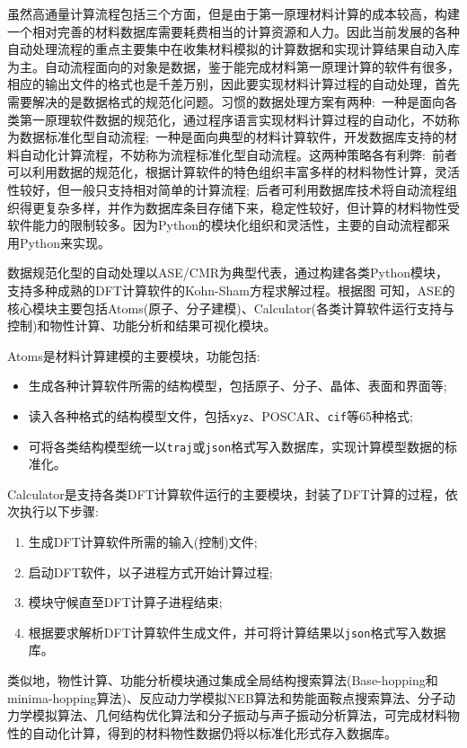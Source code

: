 虽然高通量计算流程包括三个方面，但是由于第一原理材料计算的成本较高，构建一个相对完善的材料数据库需要耗费相当的计算资源和人力。因此当前发展的各种自动处理流程的重点主要集中在收集材料模拟的计算数据和实现计算结果自动入库为主。自动流程面向的对象是数据，鉴于能完成材料第一原理计算的软件有很多，相应的输出文件的格式也是千差万别，因此要实现材料计算过程的自动处理，首先需要解决的是数据格式的规范化问题。习惯的数据处理方案有两种:~一种是面向各类第一原理软件数据的规范化，通过程序语言实现材料计算过程的自动化，不妨称为数据标准化型自动流程;~一种是面向典型的材料计算软件，开发数据库支持的材料自动化计算流程，不妨称为流程标准化型自动流程。这两种策略各有利弊:~前者可以利用数据的规范化，根据计算软件的特色组织丰富多样的材料物性计算，灵活性较好，但一般只支持相对简单的计算流程;~后者可利用数据库技术将自动流程组织得更复杂多样，并作为数据库条目存储下来，稳定性较好，但计算的材料物性受软件能力的限制较多。因为\textrm{Python}\cite{Python_URL}的模块化组织和灵活性，主要的自动流程都采用\textrm{Python}来实现。

数据规范化型的自动处理以\textrm{ASE/CMR}为典型代表，通过构建各类\textrm{Python}模块，支持多种成熟的\textrm{DFT}计算软件的\textrm{Kohn-Sham}方程求解过程。根据图%
可知，\textrm{ASE}的核心模块主要包括\textrm{Atoms}(原子、分子建模)、\textrm{Calculator}(各类计算软件运行支持与控制)和物性计算、功能分析和结果可视化模块。

\textrm{Atoms}是材料计算建模的主要模块，功能包括:
\begin{itemize}
	\item 生成各种计算软件所需的结构模型，包括原子、分子、晶体、表面和界面等;
	\item 读入各种格式的结构模型文件，包括\texttt{xyz}、\textrm{POSCAR}、\texttt{cif}等65种格式;
	\item 可将各类结构模型统一以\texttt{traj}或\texttt{json}格式写入数据库，实现计算模型数据的标准化。
\end{itemize}

\textrm{Calculator}是支持各类\textrm{DFT}计算软件运行的主要模块，封装了\textrm{DFT}计算的过程，依次执行以下步骤:
\begin{enumerate}
	\item 生成\textrm{DFT}计算软件所需的输入(控制)文件;
	\item 启动\textrm{DFT}软件，以子进程方式开始计算过程;
	\item 模块守候直至\textrm{DFT}计算子进程结束;
	\item 根据要求解析\textrm{DFT}计算软件生成文件，并可将计算结果以\texttt{json}格式写入数据库。
\end{enumerate}
类似地，物性计算、功能分析模块通过集成全局结构搜索算法(\textrm{Base-hopping}和\textrm{minima-hopping}算法)、反应动力学模拟\textrm{NEB}算法和势能面鞍点搜索算法、分子动力学模拟算法、几何结构优化算法和分子振动与声子振动分析算法，可完成材料物性的自动化计算，得到的材料物性数据仍将以标准化形式存入数据库。

